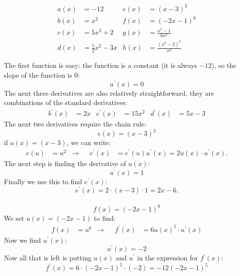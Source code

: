 \documentclass[a4paper]{report}
\begin{document}
\begin{Exercise}[title=Find the derivatives of the following functions,label=ex1,difficulty=1]
\begin{align*}
a(x) &= -12  		&  e(x) &= (x-3)^2 \\
b(x) &= x^2 		&  f(x) &= (-2x-1)^6\\
c(x) &= 5x^3 + 2 	&  g(x) &= \frac{x^2-1}{6x^4} \\
d(x) &= \frac{5}{2}x^2-3x &  h(x) &= \frac{(x^2-2)^2}{x^2}
\end{align*}
\end{Exercise}
\begin{Answer}[ref=ex1]
\noindent The first function is easy: the function is a constant (it is always $-12$), so the slope of the function is $0$:
\begin{equation*}
a^\prime (x) = 0
\end{equation*}
The next three derivatives are also relatively straightforward, they are combinations of the standard derivatives:
\begin{align*}
b^\prime (x) &= 2 x & c^\prime (x) &= 15x^2 & d^\prime (x) &= 5x-3
\end{align*}
The next two derivatives require the chain rule:
\begin{equation*}
e(x) = (x-3)^2
\end{equation*}
if $u(x)=(x-3)$, we can write:
\begin{align*}
e(u)&=u^2  & \rightarrow & &e^\prime(x)&=e^\prime(u)u^\prime(x)=2u(x)\cdot u^\prime(x).
\end{align*}
The next step is finding the derivative of $u(x)$:
\begin{equation*} 
u^\prime(x)=1
\end{equation*}
Finally we use this to find $e^\prime(x)$:
\begin{equation*}
e^\prime(x)=2\cdot (x-3)\cdot 1 =2x-6.
\end{equation*}\\

\begin{equation*}
f(x) = (-2x-1)^6
\end{equation*}
We set $u(x)=(-2x-1)$ to find:
\begin{align*}
f(x)&=u^6 & \rightarrow & & f^\prime(x)&=6u(x)^5\cdot u^\prime(x)
\end{align*}
Now we find $u^\prime(x)$:
\begin{equation*} 
u^\prime(x)=-2
\end{equation*}
Now all that is left is putting $u(x)$ and $u^\prime$ in the expression for $f^\prime(x)$: 
\begin{equation*}
f^\prime(x)=6\cdot(-2x-1)^5\cdot(-2)=-12(-2x-1)^5
\end{equation*}


\end{Answer}
\end{document}
